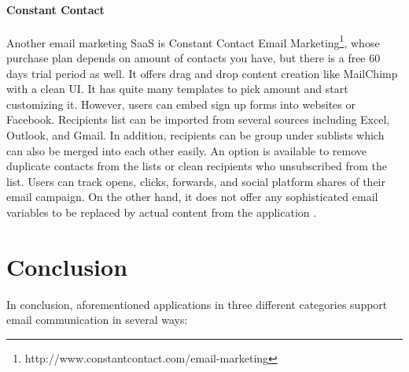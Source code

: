 \paragraph{Constant Contact}
Another email marketing \ac{SaaS} is Constant Contact Email Marketing\footnote{http://www.constantcontact.com/email-marketing}, whose purchase plan depends on amount of contacts you have, but there is a free 60 days trial period as well. It offers drag and drop content creation like MailChimp with a clean \ac{UI}. It has quite many templates to pick amount and start customizing it. However, users can embed sign up forms into websites or Facebook. Recipients list can be imported from several sources including Excel, Outlook, and Gmail. In addition, recipients can be group under sublists which can also be merged into each other easily. An option is available to remove duplicate contacts from the lists or clean recipients who unsubscribed from the list. Users can track opens, clicks, forwards, and social platform shares of their email campaign. On the other hand, it does not offer any sophisticated email variables to be replaced by actual content from the application \citep{ConstantContactInc.2013,ConstantContactInc.2013a}. 

\section{Conclusion}
\label{sec:3.3:Conc}
In conclusion, aforementioned applications in three different categories support email communication in several ways:

